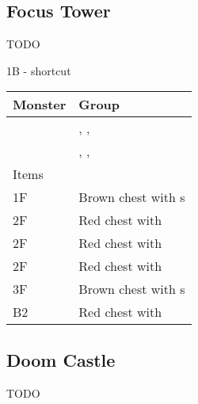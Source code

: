 \subsection{Focus Tower}
\label{map:focus_tower}

TODO

1B - shortcut 

\noindent\begin{tabularx}{\textwidth}[l]{lX}
	Monster & Group
\\ \hline
	\nameref{monster:minotaur_zombie}
	& \nameref{monster:minotaur_zombie}, \nameref{monster:shadow}, \nameref{monster:iflyte} \\
	& \nameref{monster:minotaur_zombie}, \nameref{monster:shadow}, \nameref{monster:chimera}
\\ \hline
	Items \\
	1F & Brown chest with \nameref{weapon:bomb}s \\
	2F & Red chest with \nameref{spell:fire} \\
	2F & Red chest with \nameref{armor:venus_shield} \\
	2F & Red chest with \nameref{spell:blizzard} \\
	3F & Brown chest with \nameref{item:cure_potion}s \\
	B2 & Red chest with \nameref{spell:aero}
\end{tabularx}


\subsection{Doom Castle}
\label{map:doom_castle}

TODO
